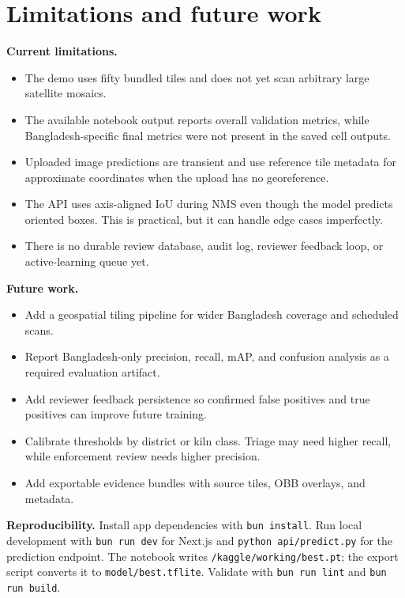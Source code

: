 \documentclass[10pt]{article}
\begin{document}
\section{Limitations and future work}
\textbf{Current limitations.}
\begin{itemize}
  \item The demo uses fifty bundled tiles and does not yet scan arbitrary large satellite mosaics.
  \item The available notebook output reports overall validation metrics, while Bangladesh-specific final metrics were not present in the saved cell outputs.
  \item Uploaded image predictions are transient and use reference tile metadata for approximate coordinates when the upload has no georeference.
  \item The API uses axis-aligned IoU during NMS even though the model predicts oriented boxes. This is practical, but it can handle edge cases imperfectly.
  \item There is no durable review database, audit log, reviewer feedback loop, or active-learning queue yet.
\end{itemize}

\textbf{Future work.}
\begin{itemize}
  \item Add a geospatial tiling pipeline for wider Bangladesh coverage and scheduled scans.
  \item Report Bangladesh-only precision, recall, mAP, and confusion analysis as a required evaluation artifact.
  \item Add reviewer feedback persistence so confirmed false positives and true positives can improve future training.
  \item Calibrate thresholds by district or kiln class. Triage may need higher recall, while enforcement review needs higher precision.
  \item Add exportable evidence bundles with source tiles, OBB overlays, and metadata.
\end{itemize}

\textbf{Reproducibility.} Install app dependencies with \texttt{bun install}. Run local development with \texttt{bun run dev} for Next.js and \texttt{python api/predict.py} for the prediction endpoint. The notebook writes \texttt{/kaggle/working/best.pt}; the export script converts it to \texttt{model/best.tflite}. Validate with \texttt{bun run lint} and \texttt{bun run build}.
\end{document}
